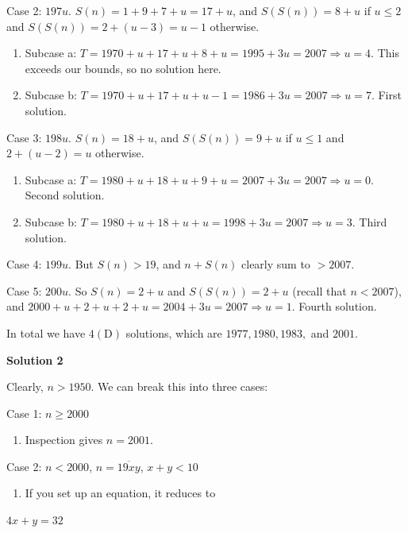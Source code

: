 \begin{enumerate}
 Case 2: $197u$. $S(n) = 1 + 9 + 7 + u = 17 + u$, and $S(S(n)) = 8+u$ if $u \le 2$ and $S(S(n)) = 2 + (u-3) = u-1$ otherwise. 

 
            \begin{enumerate}[label=(\roman*)]
                \item Subcase a: $T = 1970 + u + 17 + u + 8 + u = 1995 + 3u = 2007 \Longrightarrow u = 4$. This exceeds our bounds, so no solution here.\item Subcase b: $T = 1970 + u + 17 + u + u - 1 = 1986 + 3u = 2007 \Longrightarrow u = 7$. First solution.
            \end{enumerate}
            Case 3: $198u$. $S(n) = 18 + u$, and $S(S(n)) = 9 + u$ if $u \le 1$ and $2 + (u-2) = u$ otherwise.

 
            \begin{enumerate}[label=(\roman*)]
                \item Subcase a: $T = 1980 + u + 18 + u + 9 + u = 2007 + 3u = 2007 \Longrightarrow u = 0$. Second solution.\item Subcase b: $T = 1980 + u + 18 + u + u = 1998 + 3u = 2007 \Longrightarrow u = 3$. Third solution.
            \end{enumerate}
            Case 4: $199u$. But $S(n) > 19$, and $n + S(n)$ clearly sum to $> 2007$.

 Case 5: $200u$. So $S(n) = 2 + u$ and $S(S(n)) = 2 + u$ (recall that $n < 2007$), and $2000 + u + 2 + u + 2 + u = 2004 + 3u = 2007 \Longrightarrow u = 1$. Fourth solution.

 In total we have $4 \mathrm{(D)}$ solutions, which are $1977, 1980, 1983,$ and $2001$.

 



\textbf{Solution 2}

Clearly, $n > 1950$. We can break this into three cases:

 Case 1: $n \geq 2000$

 
            \begin{enumerate}[label=(\roman*)]
                \item Inspection gives $n = 2001$.
            \end{enumerate}
            Case 2: $n < 2000$, $n = \overline{19xy}$, $x + y < 10$

 
            \begin{enumerate}[label=(\roman*)]
                \item If you set up an equation, it reduces to
            \end{enumerate}
            $4x + y = 32$


\end{enumerate}
